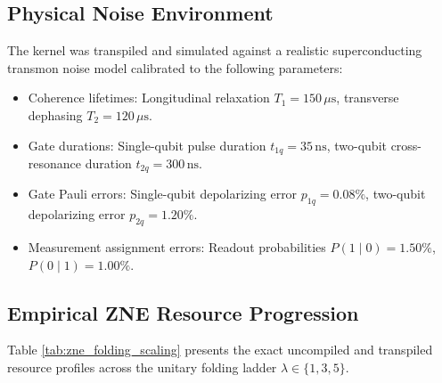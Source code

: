 \subsection{Physical Noise Environment}
The kernel was transpiled and simulated against a realistic superconducting transmon noise model calibrated to the following parameters:
\begin{itemize}[leftmargin=*]
    \item Coherence lifetimes: Longitudinal relaxation $T_1 = 150\,\mu\mathrm{s}$, transverse dephasing $T_2 = 120\,\mu\mathrm{s}$.
    \item Gate durations: Single-qubit pulse duration $t_{1q} = 35\,\mathrm{ns}$, two-qubit cross-resonance duration $t_{2q} = 300\,\mathrm{ns}$.
    \item Gate Pauli errors: Single-qubit depolarizing error $p_{1q} = 0.08\%$, two-qubit depolarizing error $p_{2q} = 1.20\%$.
    \item Measurement assignment errors: Readout probabilities $P(1\mid 0) = 1.50\%$, $P(0\mid 1) = 1.00\%$.
\end{itemize}

\subsection{Empirical ZNE Resource Progression}
Table \ref{tab:zne_folding_scaling} presents the exact uncompiled and transpiled resource profiles across the unitary folding ladder $\lambda \in \{1, 3, 5\}$.

